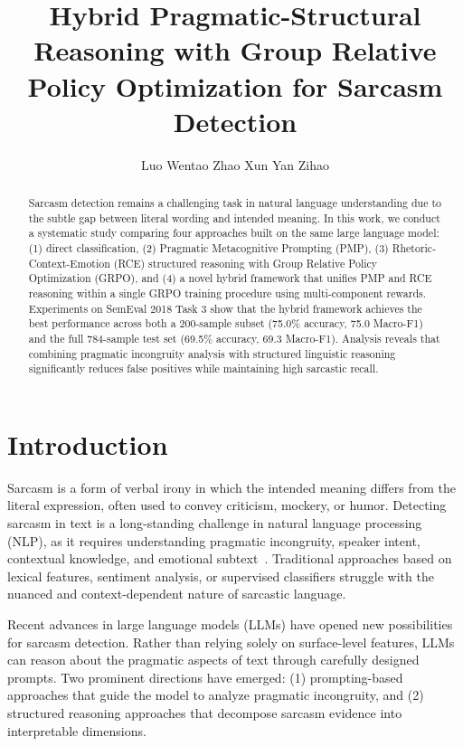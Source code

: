 \documentclass{article} %
\title{Hybrid Pragmatic-Structural Reasoning with Group Relative\\Policy Optimization for Sarcasm Detection}
\author{
  Luo Wentao \And Zhao Xun \And Yan Zihao
}
\begin{document}
\ifcolmsubmission
\linenumbers
\fi

\maketitle

\begin{abstract}
Sarcasm detection remains a challenging task in natural language understanding due to the subtle gap between literal wording and intended meaning. In this work, we conduct a systematic study comparing four approaches built on the same large language model: (1) direct classification, (2) Pragmatic Metacognitive Prompting (PMP), (3) Rhetoric-Context-Emotion (RCE) structured reasoning with Group Relative Policy Optimization (GRPO), and (4) a novel hybrid framework that unifies PMP and RCE reasoning within a single GRPO training procedure using multi-component rewards. Experiments on SemEval 2018 Task 3 show that the hybrid framework achieves the best performance across both a 200-sample subset (75.0\% accuracy, 75.0 Macro-F1) and the full 784-sample test set (69.5\% accuracy, 69.3 Macro-F1). Analysis reveals that combining pragmatic incongruity analysis with structured linguistic reasoning significantly reduces false positives while maintaining high sarcastic recall.
\end{abstract}

\section{Introduction}

Sarcasm is a form of verbal irony in which the intended meaning differs from the literal expression, often used to convey criticism, mockery, or humor. Detecting sarcasm in text is a long-standing challenge in natural language processing (NLP), as it requires understanding pragmatic incongruity, speaker intent, contextual knowledge, and emotional subtext~\citep{joshi2017context}. Traditional approaches based on lexical features, sentiment analysis, or supervised classifiers struggle with the nuanced and context-dependent nature of sarcastic language.

Recent advances in large language models (LLMs) have opened new possibilities for sarcasm detection. Rather than relying solely on surface-level features, LLMs can reason about the pragmatic aspects of text through carefully designed prompts. Two prominent directions have emerged: (1) prompting-based approaches that guide the model to analyze pragmatic incongruity, and (2) structured reasoning approaches that decompose sarcasm evidence into interpretable dimensions.
\end{document}

